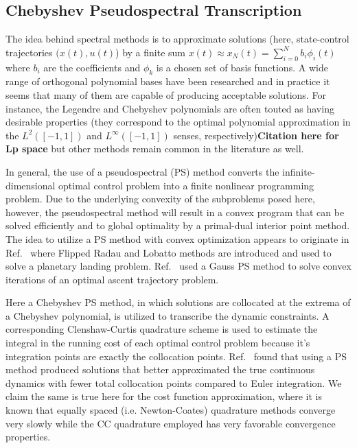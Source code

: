 \documentclass[10pt,a4paper]{article}
\begin{document}
	\subsection{Chebyshev Pseudospectral Transcription}
	The idea behind spectral methods is to approximate solutions (here, state-control trajectories $ (x(t),u(t) $) by a finite sum $x(t) \approx x_N(t) = \sum_{i=0}^{N}b_i\phi_i(t)$ where $b_i$ are the coefficients and $ {\phi_k} $ is a chosen set of basis functions. A wide range of orthogonal polynomial bases have been researched \cite{ChebyPS,LegendrePS,RadauPS,GPOPS} and in practice it seems that many of them are capable of producing acceptable solutions. For instance, the Legendre and Chebyshev polynomials are often touted as having desirable properties (they correspond to the optimal polynomial approximation in the $L^2([-1,1])$ and $L^\infty([-1,1])$ senses, respectively)\textbf{Citation here for Lp space} but other methods remain common in the literature as well.
	
	In general, the use of a pseudospectral (PS) method converts the infinite-dimensional optimal control problem into a finite nonlinear programming problem. Due to the underlying convexity of the subproblems posed here, however, the pseudospectral method will result in a convex program that can be solved efficiently and to global optimality by a primal-dual interior point method. The idea to utilize a PS method with convex optimization appears to originate in Ref.~\cite{PS_Convex} where Flipped Radau and Lobatto methods are introduced and used to solve a planetary landing problem. Ref.~\cite{PS_Convex_ascent} used a Gauss PS method to solve convex iterations of an optimal ascent trajectory problem. 
	
	Here a Chebyshev PS method, in which solutions are collocated at the extrema of a Chebyshev polynomial, is utilized to transcribe the dynamic constraints. A corresponding Clenshaw-Curtis quadrature scheme is used to estimate the integral in the running cost of each optimal control problem because it's integration points are exactly the collocation points.\cite{CCQuad} Ref.~\cite{PS_Convex} found that using a PS method produced solutions that better approximated the true continuous dynamics with fewer total collocation points compared to Euler integration. We claim the same is true here for the cost function approximation, where it is known that equally spaced (i.e. Newton-Coates) quadrature methods converge very slowly while the CC quadrature employed has very favorable convergence properties.
	
\end{document}

